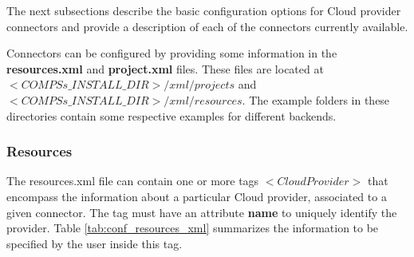The next subsections describe the basic configuration options for Cloud provider connectors and provide 
a description of each of the connectors currently available.

Connectors can be configured by providing some information in the {\bf resources.xml} and {\bf project.xml} 
files. These files are located at $<COMPSs\_INSTALL\_DIR>/xml/projects$ and $<COMPSs\_INSTALL\_DIR>/xml/resources$. 
The example folders in these directories contain some respective examples for different backends.

\subsubsection{Resources}
The resources.xml file can contain one or more tags {\bf $<CloudProvider>$} that encompass the information 
about a particular Cloud provider, associated to a given connector. The tag must have an attribute {\bf name} 
to uniquely identify the provider. Table \ref{tab:conf_resources_xml} summarizes the information to be 
specified by the user inside this tag.


